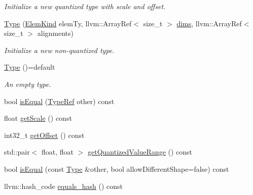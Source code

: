 \begin{DoxyCompactItemize}
\begin{DoxyCompactList}\small\item\em Initialize a new quantized type with {\ttfamily scale} and {\ttfamily offset}. \end{DoxyCompactList}\item 
\mbox{\label{structglow_1_1_type_a1aaad001ce5f372c122223f0e471ef32}} 
\hyperlink{structglow_1_1_type_a1aaad001ce5f372c122223f0e471ef32}{Type} (\hyperlink{namespaceglow_ab92e14a94329daf4083db670e95fbcdf}{Elem\+Kind} elem\+Ty, llvm\+::\+Array\+Ref$<$ size\+\_\+t $>$ \hyperlink{structglow_1_1_type_abf3890a5fdcd39b5c221a513a15c5461}{dims}, llvm\+::\+Array\+Ref$<$ size\+\_\+t $>$ alignments)
\begin{DoxyCompactList}\small\item\em Initialize a new non-\/quantized type. \end{DoxyCompactList}\item 
\mbox{\label{structglow_1_1_type_ade111bf5938519e18d21a289a5bcd2e2}} 
\hyperlink{structglow_1_1_type_ade111bf5938519e18d21a289a5bcd2e2}{Type} ()=default
\begin{DoxyCompactList}\small\item\em An empty type. \end{DoxyCompactList}\item 
bool \hyperlink{structglow_1_1_type_af3e7be136c7e3fbe626d4e997c35081c}{is\+Equal} (\hyperlink{structglow_1_1_type}{Type\+Ref} other) const
\item 
float \hyperlink{structglow_1_1_type_a1567f59601da95164a15e2071db498c4}{get\+Scale} () const
\item 
int32\+\_\+t \hyperlink{structglow_1_1_type_ab26fc83476024a82b3573735179da19c}{get\+Offset} () const
\item 
std\+::pair$<$ float, float $>$ \hyperlink{structglow_1_1_type_ad654242804d0f47b169b9548a1d2cb48}{get\+Quantized\+Value\+Range} () const
\item 
bool \hyperlink{structglow_1_1_type_a1a9738606ca71d158222ca781657b941}{is\+Equal} (const \hyperlink{structglow_1_1_type}{Type} \&other, bool allow\+Different\+Shape=false) const
\item 
llvm\+::hash\+\_\+code \hyperlink{structglow_1_1_type_a85ce8b925c137209398a5891b583285b}{equals\+\_\+hash} () const
\item 
\mbox{\label{structglow_1_1_type_ac387bef1735f8f0db555d321997386a3}} 

\end{DoxyCompactItemize}

